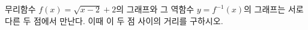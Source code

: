 무리함수 $f(x)=\sqrt{x-2}+2$의 그래프와 그 역함수 $y=f^{-1}(x)$의 그래프는 서로 다른 두 점에서 만난다. \mbox{이때} 이 두 점 사이의 거리를 구하시오.
